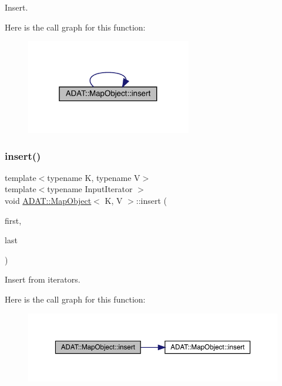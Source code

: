 Insert. 

Here is the call graph for this function\+:
\nopagebreak
\begin{figure}[H]
\begin{center}
\leavevmode
\includegraphics[width=205pt]{da/d29/classADAT_1_1MapObject_a5389738841dca1228aefe6935c464a78_cgraph}
\end{center}
\end{figure}
\mbox{\label{classADAT_1_1MapObject_a151aa826b6db5cd124ed13f4a293da2b}} 
\subsubsection{\texorpdfstring{insert()}{insert()}\hspace{0.1cm}{\footnotesize\ttfamily [4/9]}}
{\footnotesize\ttfamily template$<$typename K, typename V$>$ \\
template$<$typename Input\+Iterator $>$ \\
void \mbox{\hyperlink{classADAT_1_1MapObject}{A\+D\+A\+T\+::\+Map\+Object}}$<$ K, V $>$\+::insert (\begin{DoxyParamCaption}\item[{Input\+Iterator}]{first,  }\item[{Input\+Iterator}]{last }\end{DoxyParamCaption})\hspace{0.3cm}{\ttfamily [inline]}}



Insert from iterators. 

Here is the call graph for this function\+:
\nopagebreak
\begin{figure}[H]
\begin{center}
\leavevmode
\includegraphics[width=350pt]{da/d29/classADAT_1_1MapObject_a151aa826b6db5cd124ed13f4a293da2b_cgraph}
\end{center}
\end{figure}
\mbox{\label{classADAT_1_1MapObject_a151aa826b6db5cd124ed13f4a293da2b}} 
